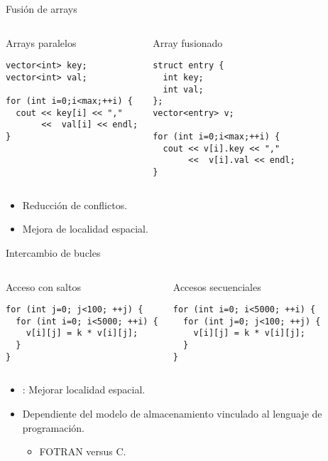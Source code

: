 \begin{frame}[t,fragile]{Fusión de arrays}
\begin{columns}[T]

\begin{block}{Arrays paralelos}
\begin{lstlisting}
vector<int> key;
vector<int> val;

for (int i=0;i<max;++i) {
  cout << key[i] << "," 
       <<  val[i] << endl;
}
\end{lstlisting}
\end{block}

\pause
{}
\begin{block}{Array fusionado}
\begin{lstlisting}
struct entry {
  int key;
  int val;
};
vector<entry> v;

for (int i=0;i<max;++i) {
  cout << v[i].key << "," 
       <<  v[i].val << endl;
}
\end{lstlisting}
\end{block}

\end{columns}

\begin{itemize}
  \item Reducción de conflictos.
  \item Mejora de localidad espacial.
\end{itemize}
\end{frame}

\begin{frame}[t,fragile]{Intercambio de bucles}
\begin{columns}[T]

\begin{block}{Acceso con saltos}
\begin{lstlisting}
for (int j=0; j<100; ++j) {
  for (int i=0; i<5000; ++i) {
    v[i][j] = k * v[i][j];
  }
}
\end{lstlisting}
\end{block}

\pause
{}
\begin{block}{Accesos secuenciales}
\begin{lstlisting}
for (int i=0; i<5000; ++i) {
  for (int j=0; j<100; ++j) {
    v[i][j] = k * v[i][j];
  }
}
\end{lstlisting}
\end{block}
\end{columns}

\begin{itemize}
  \item {}: Mejorar localidad espacial.
  \item Dependiente del modelo de almacenamiento vinculado al lenguaje de programación.
    \begin{itemize}
      \item FOTRAN versus C.
    \end{itemize}
\end{itemize}
\end{frame}

